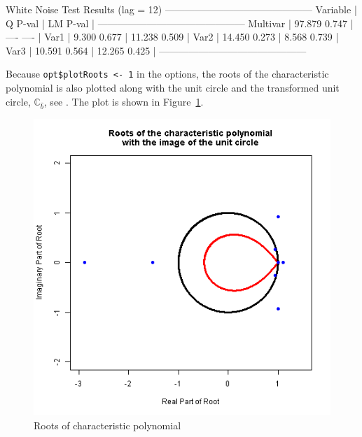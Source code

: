 \documentclass[article]{jss}
\begin{document}
\begin{CodeChunk} 
\begin{CodeOutput}
       White Noise Test Results (lag = 12)
---------------------------------------------
Variable |       Q  P-val |      LM  P-val  |
---------------------------------------------
Multivar |  97.879  0.747 |     ----  ----  |
Var1     |   9.300  0.677 |  11.238  0.509  |
Var2     |  14.450  0.273 |   8.568  0.739  |
Var3     |  10.591  0.564 |  12.265  0.425  |
---------------------------------------------
\end{CodeOutput}
\end{CodeChunk} 

Because \verb|opt$plotRoots <- 1| in the options, 
the roots of the characteristic polynomial is also plotted along with the unit circle and the transformed unit circle, $\mathbb{C}_{\hat{b}}$, see \cite{Johansen2008}. 
The plot is shown in Figure~\ref{fig:Roots}.


\begin{figure}[H]
  \centering
  \includegraphics[scale = .6, keepaspectratio=true]{Figures/roots.png}
  \caption{Roots of characteristic polynomial}
  \label{fig:Roots}
\end{figure}
\end{document}
